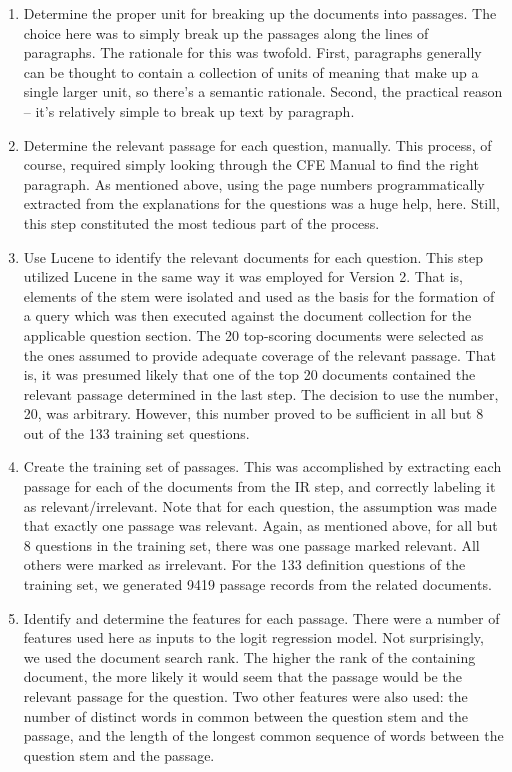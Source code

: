 \begin{enumerate}
\item Determine the proper unit for breaking up the documents into passages.  The choice here was to simply break up the passages along the lines of paragraphs.  The rationale for this was twofold.  First, paragraphs generally can be thought to contain a collection of units of meaning that make up a single larger unit, so there's a semantic rationale.  Second, the practical reason -- it's relatively simple to break up text by paragraph.

\item Determine the relevant passage for each question, manually.  This process, of course, required simply looking through the CFE Manual to find the right paragraph.  As mentioned above, using the page numbers programmatically extracted from the explanations for the questions was a huge help, here.  Still, this step constituted the most tedious part of the process.

\item Use Lucene to identify the relevant documents for each question.  This step utilized Lucene in the same way it was employed for Version 2.  That is, elements of the stem were isolated and used as the basis for the formation of a query which was then executed against the document collection for the applicable question section.  The 20 top-scoring documents were selected as the ones assumed to provide adequate coverage of the relevant passage.  That is, it was presumed likely that one of the top 20 documents contained the relevant passage determined in the last step.  The decision to use the number, 20, was arbitrary.  However, this number proved to be sufficient in all but 8 out of the 133 training set questions.  

\item Create the training set of passages.  This was accomplished by extracting each passage for each of the documents from the IR step, and correctly labeling it as relevant/irrelevant.  Note that for each question, the assumption was made that exactly one passage was relevant.  Again, as mentioned above, for all but 8 questions in the training set, there was one passage marked relevant.  All others were marked as irrelevant.  For the 133 definition questions of the training set, we generated 9419 passage records from the related documents.

\item Identify and determine the features for each passage.  There were a number of features used here as inputs to the logit regression model.  Not surprisingly, we used the document search rank.  The higher the rank of the containing document, the more likely it would seem that the passage would be the relevant passage for the question.  Two other features were also used:  the number of distinct words in common between the question stem and the passage, and the length of the longest common sequence of words between the question stem and the passage.
\end{enumerate}

